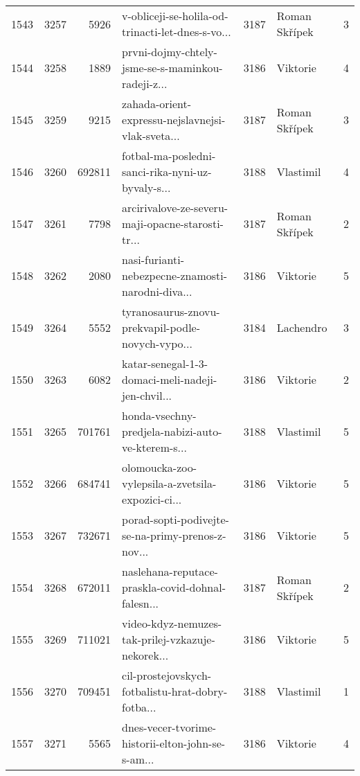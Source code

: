 \begin{tabular}{lrrlrlr}
1543 &       3257 &     5926 &  v-obliceji-se-holila-od-trinacti-let-dnes-s-vo... &     3187 &                Roman Skřípek &               3 \\
1544 &       3258 &     1889 &  prvni-dojmy-chtely-jsme-se-s-maminkou-radeji-z... &     3186 &                     Viktorie &               4 \\
1545 &       3259 &     9215 &  zahada-orient-expressu-nejslavnejsi-vlak-sveta... &     3187 &                Roman Skřípek &               3 \\
1546 &       3260 &   692811 &  fotbal-ma-posledni-sanci-rika-nyni-uz-byvaly-s... &     3188 &                    Vlastimil &               4 \\
1547 &       3261 &     7798 &  arcirivalove-ze-severu-maji-opacne-starosti-tr... &     3187 &                Roman Skřípek &               2 \\
1548 &       3262 &     2080 &  nasi-furianti-nebezpecne-znamosti-narodni-diva... &     3186 &                     Viktorie &               5 \\
1549 &       3264 &     5552 &  tyranosaurus-znovu-prekvapil-podle-novych-vypo... &     3184 &                    Lachendro &               3 \\
1550 &       3263 &     6082 &  katar-senegal-1-3-domaci-meli-nadeji-jen-chvil... &     3186 &                     Viktorie &               2 \\
1551 &       3265 &   701761 &  honda-vsechny-predjela-nabizi-auto-ve-kterem-s... &     3188 &                    Vlastimil &               5 \\
1552 &       3266 &   684741 &  olomoucka-zoo-vylepsila-a-zvetsila-expozici-ci... &     3186 &                     Viktorie &               5 \\
1553 &       3267 &   732671 &  porad-sopti-podivejte-se-na-primy-prenos-z-nov... &     3186 &                     Viktorie &               5 \\
1554 &       3268 &   672011 &  naslehana-reputace-praskla-covid-dohnal-falesn... &     3187 &                Roman Skřípek &               2 \\
1555 &       3269 &   711021 &  video-kdyz-nemuzes-tak-prilej-vzkazuje-nekorek... &     3186 &                     Viktorie &               5 \\
1556 &       3270 &   709451 &  cil-prostejovskych-fotbalistu-hrat-dobry-fotba... &     3188 &                    Vlastimil &               1 \\
1557 &       3271 &     5565 &  dnes-vecer-tvorime-historii-elton-john-se-s-am... &     3186 &                     Viktorie &               4 \\

\end{tabular}
